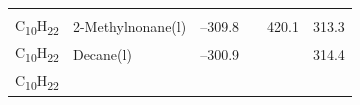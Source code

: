 \documentclass[
  9pt,
]{extbook}
\theoremstyle{definition}
\theoremstyle{definition}
\theoremstyle{definition}
\theoremstyle{remark}
\begin{document}
\begin{longtable}[]{@{}llllll@{}}
\begin{minipage}[t]{0.15\columnwidth}
\strut
\end{minipage} & \begin{minipage}[t]{0.14\columnwidth}\raggedright
\strut
\end{minipage} & \begin{minipage}[t]{0.14\columnwidth}\raggedright
\strut
\end{minipage}\tabularnewline
\begin{minipage}[t]{0.07\columnwidth}\raggedright
C\textsubscript{10}H\textsubscript{22}\strut
\end{minipage} & \begin{minipage}[t]{0.17\columnwidth}\raggedright
2-Methylnonane(l)\strut
\end{minipage} & \begin{minipage}[t]{0.15\columnwidth}\raggedright
--309.8\strut
\end{minipage} & \begin{minipage}[t]{0.15\columnwidth}\raggedright
\strut
\end{minipage} & \begin{minipage}[t]{0.14\columnwidth}\raggedright
420.1\strut
\end{minipage} & \begin{minipage}[t]{0.14\columnwidth}\raggedright
313.3\strut
\end{minipage}\tabularnewline
\begin{minipage}[t]{0.07\columnwidth}\raggedright
C\textsubscript{10}H\textsubscript{22}\strut
\end{minipage} & \begin{minipage}[t]{0.17\columnwidth}\raggedright
Decane(l)\strut
\end{minipage} & \begin{minipage}[t]{0.15\columnwidth}\raggedright
--300.9\strut
\end{minipage} & \begin{minipage}[t]{0.15\columnwidth}\raggedright
\strut
\end{minipage} & \begin{minipage}[t]{0.14\columnwidth}\raggedright
\strut
\end{minipage} & \begin{minipage}[t]{0.14\columnwidth}\raggedright
314.4\strut
\end{minipage}\tabularnewline
\begin{minipage}[t]{0.07\columnwidth}\raggedright
C\textsubscript{10}H\textsubscript{22}\strut
\end{minipage} & \begin{minipage}[t]{0.17\columnwidth}\raggedright

\end{minipage}
\end{longtable}
\end{document}
